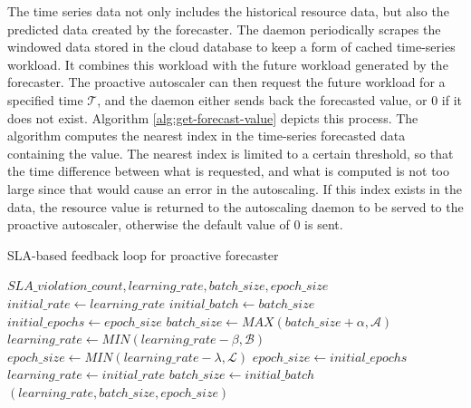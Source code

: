 The time series data not only includes the historical resource data, but also the predicted data created by the forecaster. The daemon periodically scrapes the windowed data stored in the cloud database to keep a form of cached time-series workload. It combines this workload with the future workload generated by the forecaster. The proactive autoscaler can then request the future workload for a specified time $\mathcal{T}$, and the daemon either sends back the forecasted value, or $0$ if it does not exist. Algorithm \ref{alg:get-forecast-value} depicts this process. The algorithm computes the nearest index in the time-series forecasted data containing the value. The nearest index is limited to a certain threshold, so that the time difference between what is requested, and what is computed is not too large since that would cause an error in the autoscaling. If this index exists in the data, the resource value is returned to the autoscaling daemon to be served to the proactive autoscaler, otherwise the default value of $0$ is sent.

\begin{algorithm}
    \caption{SLA-based feedback loop for proactive forecaster}
    \label{alg:sla-heuristic-feedback}
    \begin{algorithmic}
        \Require $SLA\_violation\_count, learning\_rate, batch\_size, epoch\_size$
        \State $initial\_rate \gets learning\_rate$
        \State $initial\_batch \gets batch\_size$
        \State $initial\_epochs \gets epoch\_size$
            \State $batch\_size \gets MAX(batch\_size + \alpha, \mathcal{A})$
            \State $learning\_rate \gets MIN(learning\_rate - \beta, \mathcal{B})$
            \State $epoch\_size \gets MIN(learning\_rate - \lambda, \mathcal{L})$
        \Else
            \State $epoch\_size \gets initial\_epochs$
            \State $learning\_rate \gets initial\_rate$
            \State $batch\_size \gets initial\_batch$
        \EndIf
        \State \Return $(learning\_rate, batch\_size, epoch\_size)$
    \end{algorithmic}
\end{algorithm}

